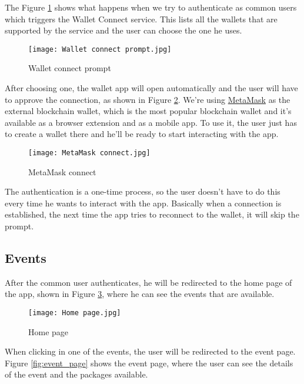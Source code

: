 The Figure \ref{fig:wallet_connect_prompt} shows what happens when we try to
authenticate as common users which triggers the Wallet Connect service. This
lists all the wallets that are supported by the service and the user can choose
the one he uses.

\begin{figure}[H]
	\texttt{[image: Wallet connect prompt.jpg]}
	\centering
	\caption{Wallet connect prompt}
	\label{fig:wallet_connect_prompt}
\end{figure}

After choosing one, the wallet app will open automatically and the user will
have to approve the connection, as shown in Figure \ref{fig:metamask_connect}.
We're using \href{https://metamask.io/}{MetaMask} as the external blockchain
wallet, which is the most popular blockchain wallet and it's available as a
browser extension and as a mobile app. To use it, the user just has to create a
wallet there and he'll be ready to start interacting with the app.

\begin{figure}[H]
	\texttt{[image: MetaMask connect.jpg]}
	\centering
	\caption{MetaMask connect}
	\label{fig:metamask_connect}
\end{figure}

The authentication is a one-time process, so the user doesn't have to do this
every time he wants to interact with the app. Basically when a connection is
established, the next time the app tries to reconnect to the wallet, it will
skip the prompt.

\subsection{Events}
\label{subsec:events}

After the common user authenticates, he will be redirected to the home page of
the app, shown in Figure \ref{fig:home_page}, where he can see the events that
are available.

\begin{figure}[H]
	\texttt{[image: Home page.jpg]}
	\centering
	\caption{Home page}
	\label{fig:home_page}
\end{figure}

When clicking in one of the events, the user will be redirected to the event
page. Figure \ref{fig:event_page} shows the event page, where the user can see
the details of the event and the packages available.

